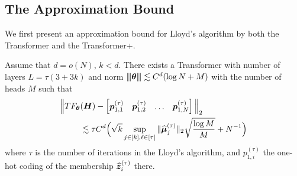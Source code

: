 \subsection{The Approximation Bound}\label{approx1}
We first present an approximation bound for Lloyd's algorithm by both the Transformer and the Transformer+.
\begin{theorem}\label{thm_main1}
   Assume that $d=o(N)$, $k<d$. There exists a Transformer with number of layers $L=\tau(3+3k)$ and norm ${\left\vert\kern-0.25ex\left\vert\kern-0.25ex\left\vert \boldsymbol{\theta} \right\vert\kern-0.25ex\right\vert\kern-0.25ex\right\vert}\lesssim C^d(\log N +M)$ with the number of heads $M$ such that
    \begin{align*}
        \Big\Vert TF_{\boldsymbol{\theta}}&(\boldsymbol{H})-\begin{bmatrix}
            \boldsymbol{p}_{1,1}^{(\tau)}&\boldsymbol{p}_{1,2}^{(\tau)}&\ldots&\boldsymbol{p}_{1,N}^{(\tau)}
        \end{bmatrix}\Big\Vert_2\\
        &\lesssim \tau C^d\Big(\sqrt k\sup_{j\in[k],\ell\in[\tau]}\Vert\widehat{\boldsymbol{\mu}}_j^{(\tau)}\Vert_2\sqrt{\frac{\log M}{M}}+N^{-1}\Big)
    \end{align*}
where $\tau$ is the number of iterations in the Lloyd's algorithm, and $p_{1,i}^{(\tau)}$ the one-hot coding of the membership $\widehat{\boldsymbol{z}}_i^{(\tau)}$ there.
\end{theorem}

